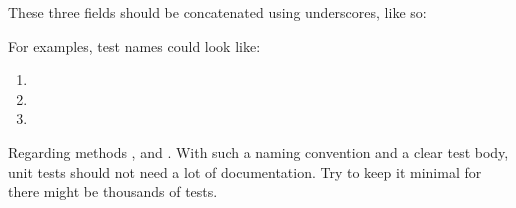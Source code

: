 These three fields should be concatenated using underscores, like so: 

\begin{center}
\end{center}

For examples, test names could look like:

\begin{enumerate}
 \item {}
 \item {}
 \item {}
\end{enumerate}

Regarding methods ,  and 
. With such a naming convention and a clear 
test body, unit tests should not need a lot of documentation. Try to 
keep it minimal for there might be thousands of tests.